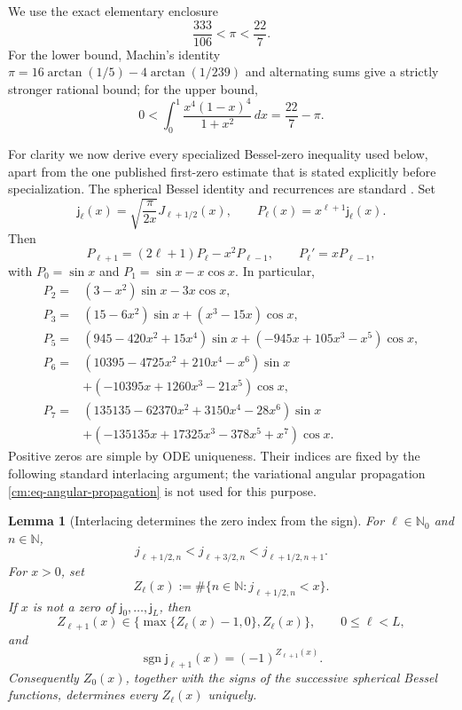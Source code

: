 \documentclass[11pt]{article}
\numberwithin{equation}{section}
\newtheorem{lemma}[theorem]{Lemma}
\theoremstyle{definition}
\theoremstyle{remark}
\begin{document}
We use the exact elementary enclosure
\begin{equation}
 \frac{333}{106}<\pi<\frac{22}{7}.
 \label{cm:eq-pi}
\end{equation}
For the lower bound, Machin's identity
\(\pi=16\arctan(1/5)-4\arctan(1/239)\) and alternating sums give a
strictly stronger rational bound; for the upper bound,
\[
 0<\int_0^1\frac{x^4(1-x)^4}{1+x^2}\,dx=\frac{22}{7}-\pi.
\]

For clarity we now derive every specialized Bessel-zero inequality used
below, apart from the one published first-zero estimate that is stated
explicitly before specialization.  The spherical Bessel identity and
recurrences are standard \cite{DLMF}.  Set
\[
 \mathsf j_\ell(x)=\sqrt{\frac{\pi}{2x}}J_{\ell+1/2}(x),
 \qquad
 P_\ell(x)=x^{\ell+1}\mathsf j_\ell(x).
\]
Then
\begin{equation}
 P_{\ell+1}=(2\ell+1)P_\ell-x^2P_{\ell-1},
 \qquad P_\ell'=xP_{\ell-1},
 \label{cm:eq-P-recurrence}
\end{equation}
with \(P_0=\sin x\) and \(P_1=\sin x-x\cos x\).  In particular,
\[
\begin{aligned}
P_2={}&(3-x^2)\sin x-3x\cos x,\\
P_3={}&(15-6x^2)\sin x+(x^3-15x)\cos x,\\
P_5={}&(945-420x^2+15x^4)\sin x
       +(-945x+105x^3-x^5)\cos x,\\
P_6={}&(10395-4725x^2+210x^4-x^6)\sin x\\
 &+(-10395x+1260x^3-21x^5)\cos x,\\
P_7={}&(135135-62370x^2+3150x^4-28x^6)\sin x\\
 &+(-135135x+17325x^3-378x^5+x^7)\cos x.
\end{aligned}
\]
Positive zeros are simple by ODE uniqueness.  Their indices are fixed by
the following standard interlacing argument; the variational angular
propagation \eqref{cm:eq-angular-propagation} is not used for this purpose.

\begin{lemma}[Interlacing determines the zero index from the sign]
\label{cm:lem-zero-index}
For \(\ell\in\mathbb N_0\) and \(n\in\mathbb N\),
\begin{equation}
 j_{\ell+1/2,n}<j_{\ell+3/2,n}<j_{\ell+1/2,n+1}.
 \label{cm:eq-adjacent-interlacing}
\end{equation}
For \(x>0\), set
\[
 Z_\ell(x):=\#\{n\in\mathbb N:j_{\ell+1/2,n}<x\}.
\]
If \(x\) is not a zero of
\(\mathsf j_0,\ldots,\mathsf j_L\), then
\begin{equation}
 Z_{\ell+1}(x)\in
 \bigl\{\max\{Z_\ell(x)-1,0\},Z_\ell(x)\bigr\},
 \qquad 0\leq\ell<L,
 \label{cm:eq-count-two-choices}
\end{equation}
and
\begin{equation}
 \operatorname{sgn}\mathsf j_{\ell+1}(x)
 =(-1)^{Z_{\ell+1}(x)}.
 \label{cm:eq-count-parity}
\end{equation}
Consequently \(Z_0(x)\), together with the signs of the successive
spherical Bessel functions, determines every \(Z_\ell(x)\) uniquely.
\end{lemma}
\end{document}

